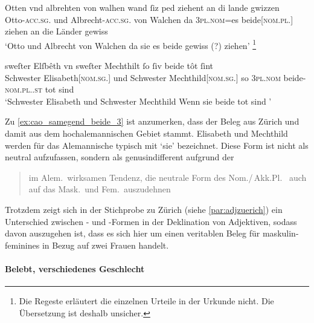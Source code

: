 \begin{exe}
\ex \label{ex:cao_samegend_beide}
\begin{xlist}

	\ex \label{ex:cao_samegend_beide_2}
		\gll Otten vnd albrehten von walhen \textelp{} wand
			ſiz ped ziehent an di lande gwizzen \\
			Otto-\textsc{acc.sg.\MascM} und Albrecht-\textsc{acc.sg.\MascM} von Walchen
			{} da \textsc{3pl\subM.nom}=es beide[\textsc{nom.pl.\MascM}] ziehen an die
			Länder gewiss \\
		\trans `Otto und Albrecht von Walchen \textelp{} da sie es beide
			gewiss (?)  ziehen'%
			\footnote{Die Regeste \autocite[80]{caor} erläutert die einzelnen
			Urteile in der Urkunde nicht. Die Übersetzung ist deshalb
			unsicher.}
			\parencites(Nr. 491, Salzburg, 1281)[431,41 und 432.38]{cao1}

	\ex \label{ex:cao_samegend_beide_3}
		\gll sweſter Elſbêth vn sweſter Mechthilt \textelp{} ſo
			ſiv beide tôt ſint~\textelp{} \\
			Schwester Elisabeth[\textsc{nom.sg.\FemF}] und Schwester
			Mechthild[\textsc{nom.sg.\FemF}] {} so \textsc{3pl\subF.nom}
			beide-\textsc{nom.pl.\FemF.st} tot sind \\
		\trans `Schwester Elisabeth und Schwester Mechthild \textelp{}
			Wenn sie beide tot sind \textelp{}'
			\parencites(Nr.~1504, Zürich, 1291)[679,12--13]{cao2}
\end{xlist}
\end{exe}

Zu \cref{ex:cao_samegend_beide_3} ist anzumerken, dass der Beleg aus Zürich und
damit aus dem hochalemannischen Gebiet stammt. Elisabeth und Mechthild werden
für das Alemannische typisch mit  `sie' bezeichnet. Diese Form
ist nicht als neutral aufzufassen, sondern als genusindifferent aufgrund der
\blockcquote[395]{ksw2}{im Alem.\ wirksamen Tendenz, die neutrale Form
 des Nom./\,Akk.Pl.\ \textelp{} auch auf das Mask.\ und Fem.\
auszudehnen}. Trotzdem zeigt sich in der Stichprobe zu Zürich (siehe
\cref{par:adjzuerich}) ein Unterschied zwischen \norm{e}- und
-Formen in der Deklination von Adjektiven, sodass davon auszugehen
ist, dass es sich hier um einen veritablen Beleg für maskulin-feminines
\norm{bėide} in Bezug auf zwei Frauen handelt.

\paragraph{Belebt, verschiedenes Geschlecht}

